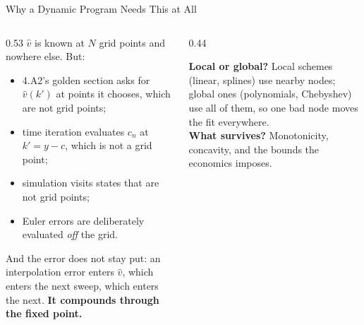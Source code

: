 \begin{frame}{Why a Dynamic Program Needs This at All}
\begin{columns}[T]
\begin{column}{0.53\textwidth}
\small
$\hat v$ is known at $N$ grid points and nowhere else. But:
\begin{itemize}\footnotesize
  \item 4.A2's golden section asks for $\hat v(k')$ at points it chooses, which are not grid points;
  \item time iteration evaluates $c_n$ at $k'=y-c$, which is not a grid point;
  \item simulation visits states that are not grid points;
  \item Euler errors are deliberately evaluated \emph{off} the grid.
\end{itemize}
\medskip
And the error does not stay put: an interpolation error enters $\hat v$, which enters the next sweep, which enters the next. \textbf{It compounds through the fixed point.}
\end{column}
\begin{column}{0.44\textwidth}
\begin{conceptbox}[title=\textbf{Two questions, always}]\small
\textbf{Local or global?} Local schemes (linear, splines) use nearby nodes; global ones (polynomials, Chebyshev) use all of them, so one bad node moves the fit everywhere.\\[1mm]
\textbf{What survives?} Monotonicity, concavity, and the bounds the economics imposes.
\end{conceptbox}
\end{column}
\end{columns}
\vspace{1mm}
\end{frame}

